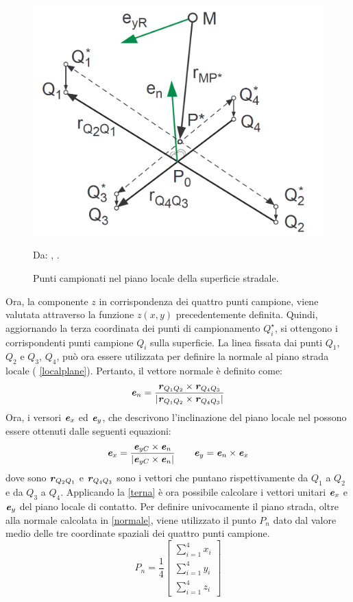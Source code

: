 \begin{figure}[h]
	\centering
	\includegraphics[width=0.5\linewidth]{Figures/local_track}
	\caption{Punti campionati nel piano locale della superficie stradale.}
	Da: \citeauthor{Rill}, .
	\label{localtrack}
\end{figure}

Ora, la componente $z$ in corrispondenza dei quattro punti campione, viene valutata attraverso la funzione $z(x,y)$ precedentemente definita. Quindi, aggiornando la terza coordinata dei punti di campionamento $Q^\star_i$, si ottengono i corrispondenti punti campione $Q_i$ sulla superficie. La linea fissata dai punti $Q_1$, $Q_2$ e $Q_3$, $Q_4$, può ora essere utilizzata per definire la normale al piano strada locale (\figurename{ \ref{localplane}}). Pertanto, il vettore normale è definito come:
%
\begin{equation}
\textbf{\textit{e}}_n = \frac{\textbf{\textit{r}}_{Q_1 Q_2} \times \textbf{\textit{r}}_{Q_4 Q_3}}{|\textbf{\textit{r}}_{Q_1 Q_2} \times \textbf{\textit{r}}_{Q_4 Q_3}|}
\label{normale}
\end{equation}
%
Ora, i versori $\textbf{\textit{e}}_x$ ed $\textbf{\textit{e}}_y$, che descrivono l'inclinazione del piano locale nel possono essere ottenuti dalle seguenti equazioni:
%
\begin{equation}
\textbf{\textit{e}}_x = \frac{\textbf{\textit{e}}_{yC}\times\textbf{\textit{e}}_{n}}{|\textbf{\textit{e}}_{yC}\times\textbf{\textit{e}}_{n}|}
\qquad
\textbf{\textit{e}}_{y} = \textbf{\textit{e}}_{n}\times\textbf{\textit{e}}_{x}
\label{terna}
\end{equation}
%
dove sono $\textbf{\textit{r}}_{Q_2 Q_1}$ e $\textbf{\textit{r}}_{Q_4 Q_3}$ sono i vettori che puntano rispettivamente da $Q_1$ a $Q_2$ e da $Q_3$ a $Q_4$. Applicando la \eqref{terna} è ora possibile calcolare i vettori unitari $\textbf{\textit{e}}_{x}$ e $\textbf{\textit{e}}_{y}$ del piano locale di contatto. Per definire univocamente il piano strada, oltre alla normale calcolata in \eqref{normale}, viene utilizzato il punto $P_n$ dato dal valore medio delle tre coordinate spaziali dei quattro punti campione.
%
\begin{equation}
P_n = \frac{1}{4}\begin{bmatrix}
\sum_{i=1}^{4} x_i \\
\sum_{i=1}^{4} y_i \\
\sum_{i=1}^{4} z_i
\end{bmatrix}
\end{equation}
%
